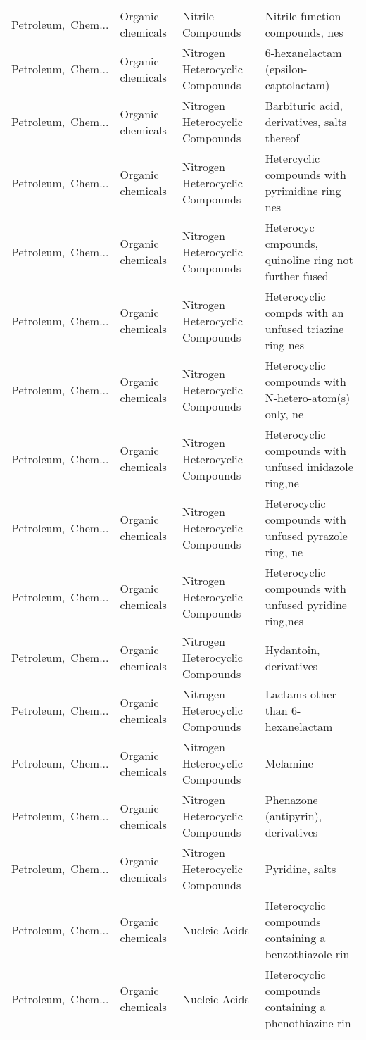 \begin{appendices}
\begin{xltabular}{\textwidth}{|p{0.10\textwidth}|p{0.25\textwidth}|p{0.24\textwidth}|p{0.31\textwidth}|}
Petroleum,\ Chem... & Organic chemicals & Nitrile Compounds & Nitrile-function compounds, nes \\
Petroleum,\ Chem... & Organic chemicals & Nitrogen Heterocyclic Compounds & 6-hexanelactam (epsilon-captolactam) \\
Petroleum,\ Chem... & Organic chemicals & Nitrogen Heterocyclic Compounds & Barbituric acid, derivatives, salts thereof \\
Petroleum,\ Chem... & Organic chemicals & Nitrogen Heterocyclic Compounds & Hetercyclic compounds with pyrimidine ring nes \\
Petroleum,\ Chem... & Organic chemicals & Nitrogen Heterocyclic Compounds & Heterocyc cmpounds, quinoline ring not further fused \\
Petroleum,\ Chem... & Organic chemicals & Nitrogen Heterocyclic Compounds & Heterocyclic compds with an unfused triazine ring nes \\
Petroleum,\ Chem... & Organic chemicals & Nitrogen Heterocyclic Compounds & Heterocyclic compounds with N-hetero-atom(s) only, ne \\
Petroleum,\ Chem... & Organic chemicals & Nitrogen Heterocyclic Compounds & Heterocyclic compounds with unfused imidazole ring,ne \\
Petroleum,\ Chem... & Organic chemicals & Nitrogen Heterocyclic Compounds & Heterocyclic compounds with unfused pyrazole ring, ne \\
Petroleum,\ Chem... & Organic chemicals & Nitrogen Heterocyclic Compounds & Heterocyclic compounds with unfused pyridine ring,nes \\
Petroleum,\ Chem... & Organic chemicals & Nitrogen Heterocyclic Compounds & Hydantoin, derivatives \\
Petroleum,\ Chem... & Organic chemicals & Nitrogen Heterocyclic Compounds & Lactams other than 6-hexanelactam \\
Petroleum,\ Chem... & Organic chemicals & Nitrogen Heterocyclic Compounds & Melamine \\
Petroleum,\ Chem... & Organic chemicals & Nitrogen Heterocyclic Compounds & Phenazone (antipyrin), derivatives \\
Petroleum,\ Chem... & Organic chemicals & Nitrogen Heterocyclic Compounds & Pyridine, salts \\
Petroleum,\ Chem... & Organic chemicals & Nucleic Acids & Heterocyclic compounds containing a benzothiazole rin \\
Petroleum,\ Chem... & Organic chemicals & Nucleic Acids & Heterocyclic compounds containing a phenothiazine rin \\

\end{xltabular}
\end{appendices}
